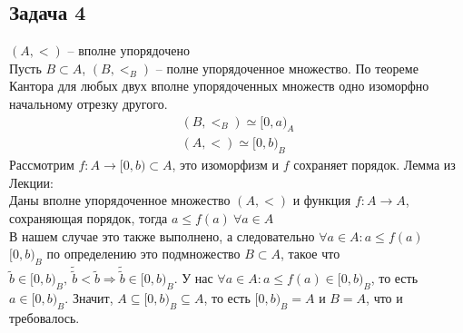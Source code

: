 \subsection*{Задача 4}
	$(A, <)$ -- вполне упорядочено\\
	Пусть $B \subset A$, $(B, <_{B})$ -- полне упорядоченное множество. По теореме Кантора для любых двух вполне упорядоченных множеств одно изоморфно начальному отрезку другого.
	\begin{gather*}
		(B, <_{B}) \simeq [0,a)_{A}\\
		(A, <) \simeq [0,b)_{B}
	\end{gather*}
	Рассмотрим $f: A \to [0,b) \subset A$, это изоморфизм и $f$ сохраняет порядок.
	\vskip 0.1in
	Лемма из Лекции:\\
	Даны вполне упорядоченное множество $(A, <)$ и функция $f: A \to A$, сохраняющая порядок, тогда $a \leqslant f(a)\ \forall a \in A$\\
	В нашем случае это также выполнено, а следовательно $\forall a \in A: a \leqslant f(a)$\\
	$[0,b)_{B}$ по определению это подмножество $B \subset A$, такое что $\tilde{b} \in [0,b)_{B},\ \tilde{\tilde{b}} < \tilde{b} \Rightarrow \tilde{\tilde{b}} \in [0,b)_{B}$. У нас $\forall a \in A: a \leqslant f(a) \in [0,b)_{B}$, то есть $a \in [0,b)_{B}$. Значит, $A \subseteq [0,b)_{B} \subseteq A$, то есть $[0,b)_{B} = A$ и $B = A$, что и требовалось.
\vskip 0.4in

